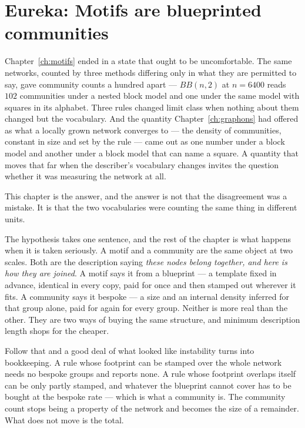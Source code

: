 \chapter{Eureka: Motifs are blueprinted communities}
\label{ch:bubbles}

Chapter~\ref{ch:motifs} ended in a state that ought to be uncomfortable. The same
networks, counted by three methods differing only in what they are permitted to
say, gave community counts a hundred apart --- $BB(n,2)$ at $n=6400$ reads
$102$ communities under a nested block model and one under the same model with
squares in its alphabet. Three rules changed limit
class when nothing about them changed but the vocabulary. And the quantity
Chapter~\ref{ch:graphons} had offered as what a locally grown network converges
to --- the density of communities, constant in size and set by the rule --- came
out as one number under a block model and another under a block model that can
name a square. A quantity that moves that far when the describer's vocabulary
changes invites the question whether it was measuring the network at all.

This chapter is the answer, and the answer is not that the disagreement was a
mistake. It is that the two vocabularies were counting the same thing in
different units.

The hypothesis takes one sentence, and the rest of the chapter is what happens
when it is taken seriously. A motif and a community are the same object at two
scales. Both are the description saying \emph{these nodes belong together, and
here is how they are joined}. A motif says it from a blueprint --- a template
fixed in advance, identical in every copy, paid for once and then stamped out
wherever it fits. A community says it bespoke --- a size and an internal density
inferred for that group alone, paid for again for every group. Neither is more
real than the other. They are two ways of buying the same structure, and minimum
description length shops for the cheaper.

Follow that and a good deal of what looked like instability turns into
bookkeeping. A rule whose footprint can be stamped over the whole network needs
no bespoke groups and reports none. A rule whose footprint overlaps itself can be
only partly stamped, and whatever the blueprint cannot cover has to be bought at
the bespoke rate --- which is what a community is. The community count stops
being a property of the network and becomes the size of a remainder. What does
not move is the total.

